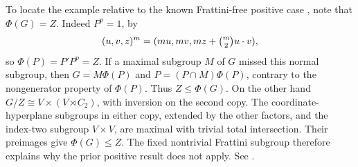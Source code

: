 To locate the example relative to the known Frattini-free positive
case \cite{system-normalizers}, note that \(\Phi(G)=Z\).
Indeed \(P^p=1\), by
\[
 (u,v,z)^m=(mu,mv,mz+\tbinom m2u\cdot v),
\]
so \(\Phi(P)=P'P^p=Z\).
If a maximal subgroup \(M\) of \(G\) missed this normal subgroup,
then \(G=M\Phi(P)\) and
\(P=(P\cap M)\Phi(P)\), contrary to the nongenerator property
of \(\Phi(P)\). Thus \(Z\le\Phi(G)\).
On the other hand
\(G/Z\cong V\times(V\rtimes C_2)\), with inversion on the second
copy. The coordinate-hyperplane subgroups in either copy, extended
by the other factors, and the index-two subgroup \(V\times V\),
are maximal with trivial total intersection.
Their preimages give \(\Phi(G)\le Z\).
The fixed nontrivial Frattini subgroup therefore explains why
the prior positive result does not apply.
See .
